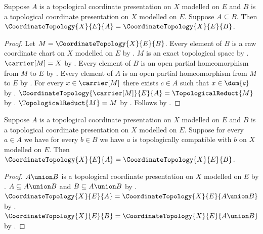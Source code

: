 \begin{theorem}\label{coordinate_presentation_extension_topology}
    Suppose $A$ is a topological coordinate presentation on $X$ modelled on $E$ and
        $B$ is a topological coordinate presentation on $X$ modelled on $E$.
    Suppose $A\subseteq B$.
    Then $\CoordinateTopology{X}{E}{A}=\CoordinateTopology{X}{E}{B}$.
\end{theorem}
\begin{proof}
    Let $M=\CoordinateTopology{X}{E}{B}$.
    Every element of $B$ is a raw coordinate chart on $X$ modelled on $E$ by
        .
    $M$ is an exact topological space by .
    $\carrier[M]=X$ by .
    Every element of $B$ is an open partial homeomorphism from $M$ to $E$ by
        .
    Every element of $A$ is an open partial homeomorphism from $M$ to $E$ by
        .
    For every $x\in\carrier[M]$ there exists $c\in A$ such that $x\in\dom{c}$ by
        .
    $\CoordinateTopology{\carrier[M]}{E}{A}=\TopologicalReduct{M}$ by
        .
    $\TopologicalReduct{M}=M$ by .
    Follows by \auto.
\end{proof}

\begin{theorem}\label{cross_compatible_presentations_same_topology}
    Suppose $A$ is a topological coordinate presentation on $X$ modelled on $E$ and
        $B$ is a topological coordinate presentation on $X$ modelled on $E$.
    Suppose for every $a\in A$ we have for every $b\in B$ we have
        $a$ is topologically compatible with $b$ on $X$ modelled on $E$.
    Then $\CoordinateTopology{X}{E}{A}=\CoordinateTopology{X}{E}{B}$.
\end{theorem}
\begin{proof}
    $A\union B$ is a topological coordinate presentation on $X$ modelled on $E$ by
        .
    $A\subseteq A\union B$ and $B\subseteq A\union B$ by
        .
    $\CoordinateTopology{X}{E}{A}=\CoordinateTopology{X}{E}{A\union B}$ by
        .
    $\CoordinateTopology{X}{E}{B}=\CoordinateTopology{X}{E}{A\union B}$ by
        .
\end{proof}

